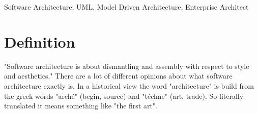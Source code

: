 %
%
%
%

\begin{abstract}
Software architecture is able to grant a lot of benefits in the process of software engineering. Furthermore it supports engineers in avoiding problems occurring during this process. This article will show why software architecture becomes more and more important to the modern world and how it can be presented to any kind of stakeholders. That includes a short description of the most important UML basics and the evaluation of an UML visualisation tool: the Enterprise Architect. Additionally there is an introduction to model driven architecture to present its purposes.
\end{abstract}
\begin{keywords}
Software Architecture, UML, Model Driven Architecture, Enterprise Architect
\end{keywords}

\section{Definition} \label{sec:Introduction}%

"Software architecture is about dismantling and assembly with respect to style and aesthetics."
\citep{kruchten1995architectural}
There are a lot of different opinions about what software architecture exactly is. In a historical view the word "architecture" is build from the greek words "arché" (begin, source) and "téchne"  (art, trade). So literally translated it means something like "the first art".  \citep{pfeifer1989etymologisches}

